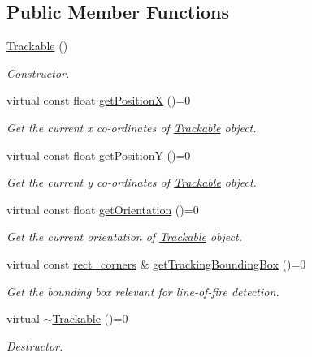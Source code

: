 \subsection*{Public Member Functions}
\begin{DoxyCompactItemize}
\item 
\hyperlink{classTrackable_aa95786c1de337603ffe42e74cef944e0}{Trackable} ()
\begin{DoxyCompactList}\small\item\em Constructor. \end{DoxyCompactList}\item 
virtual const float \hyperlink{classTrackable_ab167af97aef9656403ee2d28adaf3149}{get\-Position\-X} ()=0
\begin{DoxyCompactList}\small\item\em Get the current x co-\/ordinates of \hyperlink{classTrackable}{Trackable} object. \end{DoxyCompactList}\item 
virtual const float \hyperlink{classTrackable_add27867f4ebf30f1fe7c3f94b4d7f4d5}{get\-Position\-Y} ()=0
\begin{DoxyCompactList}\small\item\em Get the current y co-\/ordinates of \hyperlink{classTrackable}{Trackable} object. \end{DoxyCompactList}\item 
virtual const float \hyperlink{classTrackable_afc6b5126b82395a5155cfe76250f92dd}{get\-Orientation} ()=0
\begin{DoxyCompactList}\small\item\em Get the current orientation of \hyperlink{classTrackable}{Trackable} object. \end{DoxyCompactList}\item 
virtual const \hyperlink{structrect__corners}{rect\-\_\-corners} \& \hyperlink{classTrackable_a79826040547e1ca65775223f26c37648}{get\-Tracking\-Bounding\-Box} ()=0
\begin{DoxyCompactList}\small\item\em Get the bounding box relevant for line-\/of-\/fire detection. \end{DoxyCompactList}\item 
virtual \hyperlink{classTrackable_a7a9ccf236e96ac960ec05da4d2155e01}{$\sim$\-Trackable} ()=0
\begin{DoxyCompactList}\small\item\em Destructor. \end{DoxyCompactList}\end{DoxyCompactItemize}


